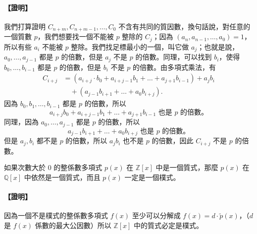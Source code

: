 \paragraph{【證明】}
我們打算證明 $C_{n+m}, C_{n+m-1}, \dots, C_0$ 不含有共同的質因數，換句話說，對任意的一個質數 $p$，我們想要找一個不能被 $p$ 整除的 $C_j$；因為 $(a_n, a_{n-1}, \dots, a_0) = 1$，所以有些 $a_i$ 不能被 $p$ 整除。我們找足標最小的一個，叫它做 $a_j$；也就是說，$a_0, \dots, a_{j-1}$ 都是 $p$ 的倍數，但是 $a_j$ 不是 $p$ 的倍數。同理，可以找到 $b_i$，使得 $b_0, \dots, b_{i-1}$ 都是 $p$ 的倍數，但是 $b_i$ 不是 $p$ 的倍數。由多項式乘法，有
\begin{align*}
  C_{i+j} &= (a_{i+j} \cdot b_0 + a_{i+j-1} b_1 + \dots + a_{j+1} b_{i-1}) + a_j b_i \\
  &\quad + (a_{j-1} b_{i+1} + \dots + a_0 b_{i+j}).
\end{align*}
因為 $b_0, b_1, \dots, b_{i-1}$ 都是 $p$ 的倍數，所以
\begin{equation*}
  a_{i+j} b_0 + a_{i+j-1} b_1 + \dots + a_{j+1} b_{i-1} \text{ 也是 $p$ 的倍數。}
\end{equation*}
同理，因為 $a_0, \dots, a_{j-1}$ 都是 $p$ 的倍數，所以
\begin{equation*}
  a_{j-1} b_{i+1} + \dots + a_0 b_{i+j} \text{ 也是 $p$ 的倍數。}
\end{equation*}
但是 $a_j, b_i$ 都不是 $p$ 的倍數，所以 $a_j b_i$ 也不是 $p$ 的倍數，因此 $C_{i+j}$ 不是 $p$ 的倍數。

\begin{corollary}\label{cor:gauss_1}
如果次數大於 $0$ 的整係數多項式 $p(x)$ 在 $\mathbb{Z}[x]$ 中是一個質式，那麼 $p(x)$ 在 $\mathbb{Q}[x]$ 中依然是一個質式，而且 $p(x)$ 一定是一個樸式。
\end{corollary}

\paragraph{【證明】}
因為一個不是樸式的整係數多項式 $f(x)$ 至少可以分解成 $f(x) = d \cdot \tilde{p}(x)$，（$d$ 是 $f(x)$ 係數的最大公因數）所以 $\mathbb{Z}[x]$ 中的質式必定是樸式。

